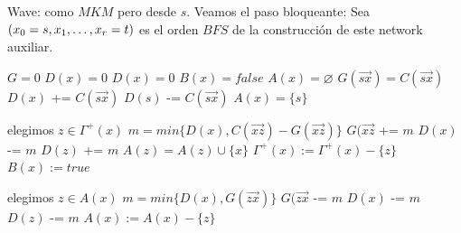 Wave: como $MKM$ pero desde $s$.
Veamos el paso bloqueante:
Sea $(x_0 = s, x_1, \mathellipsis, x_r = t)$ es el orden $BFS$ de la construcción de este network auxiliar.
\begin{algorithm}
\begin{algorithmic}
\State $G  = 0$
\State $D(x) = 0$ 
\EndFor
{}
\State $D(x) = 0$
\EndFor
{} 
\State $B(x) = false$ 
\State $A(x) = \varnothing$ 
\EndFor
{}
\State $G(\overrightarrow{sx}) = C(\overrightarrow{sx})$
\State $D(x)$ += $C(\overrightarrow{sx})$
\State $D(s)$ -= $C(\overrightarrow{sx})$
\State $A(x) = \{s\}$
\EndFor
{}
 
\EndIf
\EndFor
{} 
\EndIf
\EndFor
\EndWhile
\EndFunction
\end{algorithmic}
\end{algorithm}

\begin{algorithm}
\begin{algorithmic}
\State elegimos $z \in \Gamma^+(x)$
\Else
\State $m = min\{D(x), C(\overrightarrow{xz}) - G(\overrightarrow{xz})\}$
\State $G(\overrightarrow{xz}$ += $m$
\State $D(x)$ -= $m$
\State $D(z)$ += $m$
\State $A(z) = A(z) \cup \{x\}$
\State $\Gamma^+(x) := \Gamma^+(x) - \{z\}$
\EndIf
{}
\State $B(x) := true$
\EndIf
\EndIf
\EndWhile
\EndFunction
\end{algorithmic}
\end{algorithm}

\begin{algorithm}
\begin{algorithmic}
\State elegimos $z \in A(x)$
\State $m = min\{D(x), G(\overrightarrow{zx})\}$
\State $G(\overrightarrow{zx}$ -= $m$
\State $D(x)$ -= $m$
\State $D(z)$ -= $m$
\State $A(x) := A(x) - \{z\}$
\EndIf
\EndWhile
\EndFunction
\end{algorithmic}
\end{algorithm}

